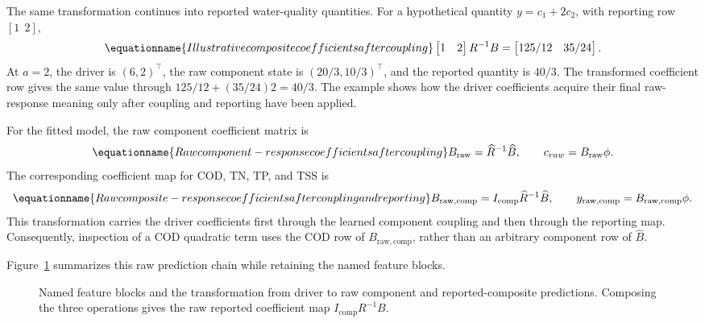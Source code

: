 The same transformation continues into reported water-quality quantities. For a hypothetical quantity \(y=c_1+2c_2\), with reporting row \([1\ \ 2]\),
\begin{equation}
\equationname{Illustrative composite coefficients after coupling}
\label{eq:icsor_small_composite_projection}
\begin{bmatrix}1&2\end{bmatrix}R^{-1}B
=\begin{bmatrix}125/12&35/24\end{bmatrix}.
\end{equation}
At \(a=2\), the driver is \((6,2)^\top\), the raw component state is \((20/3,10/3)^\top\), and the reported quantity is \(40/3\). The transformed coefficient row gives the same value through \(125/12+(35/24)2=40/3\). The example shows how the driver coefficients acquire their final raw-response meaning only after coupling and reporting have been applied.

For the fitted model, the raw component coefficient matrix is
\begin{equation}
\equationname{Raw component-response coefficients after coupling}
\label{eq:icsor_raw_component_coefficients}
B_{\mathrm{raw}}=\widehat R^{-1}\widehat B,
\qquad c_{raw}=B_{\mathrm{raw}}\phi.
\end{equation}
The corresponding coefficient map for COD, TN, TP, and TSS is
\begin{equation}
\equationname{Raw composite-response coefficients after coupling and reporting}
\label{eq:icsor_raw_composite_coefficients}
B_{\mathrm{raw,comp}}=I_{\mathrm{comp}}\widehat R^{-1}\widehat B,
\qquad y_{\mathrm{raw,comp}}=B_{\mathrm{raw,comp}}\phi.
\end{equation}
This transformation carries the driver coefficients first through the learned component coupling and then through the reporting map. Consequently, inspection of a COD quadratic term uses the COD row of \(B_{\mathrm{raw,comp}}\), rather than an arbitrary component row of \(\widehat B\).

Figure~\ref{fig:ch5_prediction_chain} summarizes this raw prediction chain while retaining the named feature blocks.

\begin{figure}[htbp]
\centering

\caption{Named feature blocks and the transformation from driver to raw component and reported-composite predictions. Composing the three operations gives the raw reported coefficient map \(I_{\mathrm{comp}}R^{-1}B\).}
\label{fig:ch5_prediction_chain}
\end{figure}

